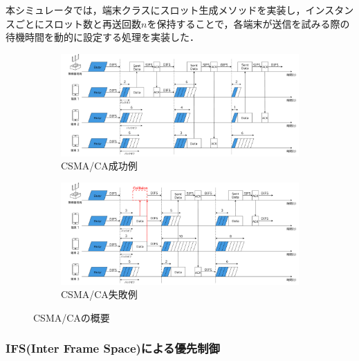 \documentclass[a4paper, 10pt]{ltjsarticle}
\begin{document}
本シミュレータでは，端末クラスにスロット生成メソッドを実装し，インスタンスごとにスロット数と再送回数$n$を保持することで，各端末が送信を試みる際の待機時間を動的に設定する処理を実装した．





\begin{figure}[htbp]
  \centering

  \begin{subfigure}{\columnwidth}
    \centering
    \includegraphics[width=1\columnwidth]{./assets/csma-ca-s.png}
    \caption{CSMA/CA成功例}
    \label{1a}
  \end{subfigure}


  \begin{subfigure}{\columnwidth}
    \centering
    \includegraphics[width=1\columnwidth]{./assets/csma-ca-f.png}
    \caption{CSMA/CA失敗例}
    \label{1b}
  \end{subfigure}


  \caption{CSMA/CAの概要}
  \label{CSMA/CA}
\end{figure}

\subsubsection{IFS(Inter Frame Space)による優先制御}
\end{document}
